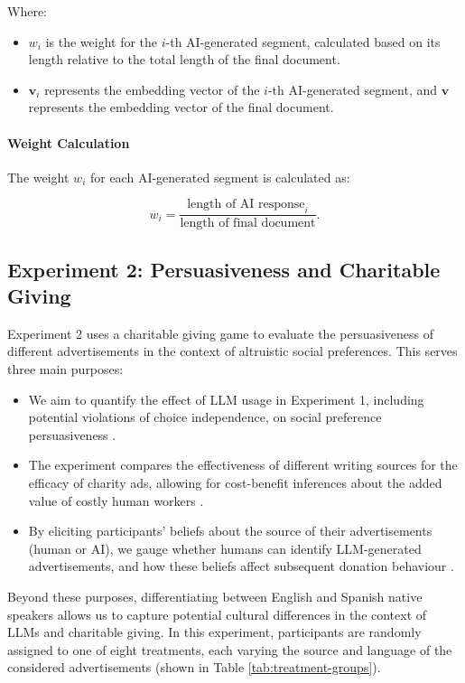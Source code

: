 Where:
\begin{itemize}
    \item $w_i$ is the weight for the \( i \)-th AI-generated segment, calculated based on its length relative to the total length of the final document.
    \item \( \mathbf{v}_i \) represents the embedding vector of the \( i \)-th AI-generated segment, and \( \mathbf{v} \) represents the embedding vector of the final document.
\end{itemize}

\paragraph{Weight Calculation}
The weight \( w_i \) for each AI-generated segment is calculated as:

\[
w_i = \frac{\text{length\ of\ AI\ response}_i}{\text{length\ of\ final\ document}}.
\]


\subsection{Experiment 2: Persuasiveness and Charitable Giving}
Experiment 2 uses a charitable giving game to evaluate the persuasiveness of different advertisements in the context of altruistic social preferences. This serves three main purposes:
\begin{itemize}
    \item We aim to quantify the effect of LLM usage in Experiment 1, including potential violations of choice independence, on social preference persuasiveness .
    \item The experiment compares the effectiveness of different writing sources for the efficacy of charity ads, allowing for cost-benefit inferences about the added value of costly human workers .
    \item By eliciting participants' beliefs about the source of their advertisements (human or AI), we gauge whether humans can identify LLM-generated advertisements, and how these beliefs affect subsequent donation behaviour .
\end{itemize}
 Beyond these purposes, differentiating between English and Spanish native speakers allows us to capture potential cultural differences in the context of LLMs and charitable giving. In this experiment, participants are randomly assigned to one of eight treatments, each varying the source and language of the considered advertisements (shown in Table \ref{tab:treatment-groups}).

